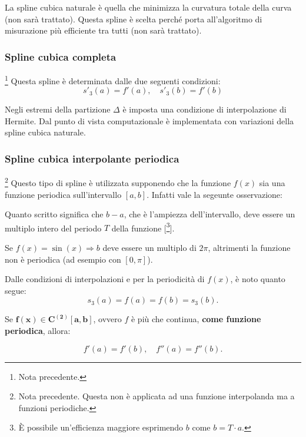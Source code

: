 La spline cubica naturale è quella che minimizza la curvatura totale della curva (non sarà trattato). Questa spline è scelta perché porta all'algoritmo di misurazione più efficiente tra tutti (non sarà trattato).

\subsubsection{Spline cubica completa}\footnote{Nota precedente.}
Questa spline è determinata dalle due seguenti condizioni:
\begin{equation}\label{eq:condSplineCubComp}
    \boxed{s'_3(a)=f'(a),\quad s'_3(b)=f'(b)}
\end{equation}

Negli estremi della partizione $\Delta$ è imposta una condizione di interpolazione di Hermite.
Dal punto di vista computazionale è implementata con variazioni della spline cubica naturale.

\subsubsection{Spline cubica interpolante periodica} \footnote{Nota precedente. Questa non è applicata ad una funzione interpolanda ma a funzioni periodiche.}
Questo tipo di spline è utilizzata supponendo che la funzione $f(x)$ sia una funzione periodica sull'intervallo $[a,b]$. Infatti vale la segeunte osservazione:

\begin{remark}
    Quanto scritto significa che $b-a$, che è l'ampiezza dell'intervallo, deve essere un multiplo intero del periodo $T$ della funzione [\footnote{È possibile un'efficienza maggiore esprimendo $b$ come $b=T\cdot a$.}].
\end{remark}

\begin{example}
    Se $f(x)=\sin(x)\Rightarrow b$ deve essere un multiplo di $2\pi$, altrimenti la funzione non è periodica (ad esempio con $[0,\pi]$).
\end{example}

Dalle condizioni di interpolazioni e per la periodicità di $f(x)$, è noto quanto segue:
\begin{equation*}
    s_3(a)=f(a)=f(b)=s_3(b).
\end{equation*}

Se $\boldsymbol{f(x)\in C^{(2)}[a,b]}$, ovvero $f$ è più che continua, \textbf{come funzione periodica}, allora:

\begin{equation}\label{eq:condPeriod}
    f'(a)=f'(b),\quad f''(a)=f''(b).
\end{equation}

